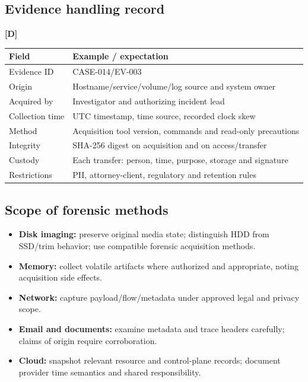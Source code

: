 \documentclass[10pt,letterpaper,oneside]{article}
\newcommand{\designed}{\textsf{\color{accent}\textbf{[D]}}}
\begin{document}
\subsection{Evidence handling record}\designed{}
\par\medskip\noindent\begin{tabularx}{\textwidth}{@{}p{}X@{}}\toprule
Field & Example / expectation \\ \midrule
Evidence ID & CASE-014/EV-003\\
Origin & Hostname/service/volume/log source and system owner\\
Acquired by & Investigator and authorizing incident lead\\
Collection time & UTC timestamp, time source, recorded clock skew\\
Method & Acquisition tool version, commands and read-only precautions\\
Integrity & SHA-256 digest on acquisition and on access/transfer\\
Custody & Each transfer: person, time, purpose, storage and signature\\
Restrictions & PII, attorney-client, regulatory and retention rules\\
\bottomrule\end{tabularx}\par\medskip
\subsection{Scope of forensic methods}
\begin{itemize}
\item \textbf{Disk imaging:} preserve original media state; distinguish HDD from SSD/trim behavior; use compatible forensic acquisition methods.
\item \textbf{Memory:} collect volatile artifacts where authorized and appropriate, noting acquisition side effects.
\item \textbf{Network:} capture payload/flow/metadata under approved legal and privacy scope.
\item \textbf{Email and documents:} examine metadata and trace headers carefully; claims of origin require corroboration.
\item \textbf{Cloud:} snapshot relevant resource and control-plane records; document provider time semantics and shared responsibility.
\end{itemize}
\end{document}

